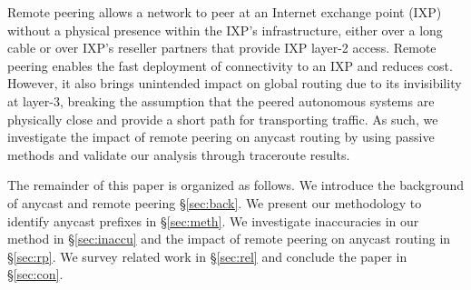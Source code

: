 Remote peering allows a network to peer at an Internet exchange point (IXP) without a physical presence within the IXP's infrastructure, either over a long cable or over IXP's reseller partners that provide IXP layer-2 access. Remote peering enables the fast deployment of connectivity to an IXP and reduces cost. However, it also brings unintended impact on global routing due to its invisibility at layer-3, breaking the assumption that the peered autonomous systems are physically close and provide a short path for transporting traffic. As such, we investigate the impact of remote peering on anycast routing by using passive methods and validate our analysis through traceroute results. 


The remainder of this paper is organized as follows. We introduce the background of anycast and remote peering \S \ref{sec:back}. We present our methodology to identify anycast prefixes in \S\ref{sec:meth}. We investigate inaccuracies in our method in \S\ref{sec:inaccu} and the impact of remote peering on anycast routing in \S\ref{sec:rp}. We survey related work in \S\ref{sec:rel} and conclude the paper in \S\ref{sec:con}.


